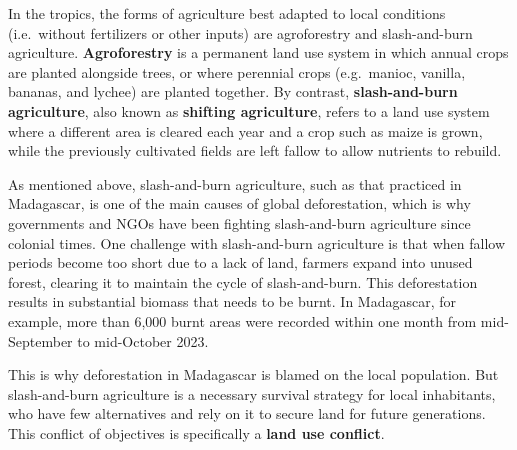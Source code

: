 \documentclass[
  a4paper,
  openany]{book}
\begin{document}
\begin{tcolorbox}[enhanced jigsaw, coltitle=black, bottomtitle=1mm, opacitybacktitle=0.6, titlerule=0mm, opacityback=0, leftrule=.75mm, colbacktitle=quarto-callout-tip-color!10!white, bottomrule=.15mm, toptitle=1mm, breakable, title={Land use change in the tropics: the case of Madagascar}, arc=.35mm, rightrule=.15mm, toprule=.15mm, left=2mm, colback=white, colframe=quarto-callout-tip-color-frame]

In the tropics, the forms of agriculture best adapted to local
conditions (i.e.~without fertilizers or other inputs) are agroforestry
and slash-and-burn agriculture. \textbf{Agroforestry} is a permanent
land use system in which annual crops are planted alongside trees, or
where perennial crops (e.g.~manioc, vanilla, bananas, and lychee) are
planted together. By contrast, \textbf{slash-and-burn agriculture}, also
known as \textbf{shifting agriculture}, refers to a land use system
where a different area is cleared each year and a crop such as maize is
grown, while the previously cultivated fields are left fallow to allow
nutrients to rebuild.

As mentioned above, slash-and-burn agriculture, such as that practiced
in Madagascar, is one of the main causes of global deforestation, which
is why governments and NGOs have been fighting slash-and-burn
agriculture since colonial times. One challenge with slash-and-burn
agriculture is that when fallow periods become too short due to a lack
of land, farmers expand into unused forest, clearing it to maintain the
cycle of slash-and-burn. This deforestation results in substantial
biomass that needs to be burnt. In Madagascar, for example, more than
6,000 burnt areas were recorded within one month from mid-September to
mid-October 2023.

This is why deforestation in Madagascar is blamed on the local
population. But slash-and-burn agriculture is a necessary survival
strategy for local inhabitants, who have few alternatives and rely on it
to secure land for future generations. This conflict of objectives is
specifically a \textbf{land use conflict}.

\end{tcolorbox}
\end{document}
